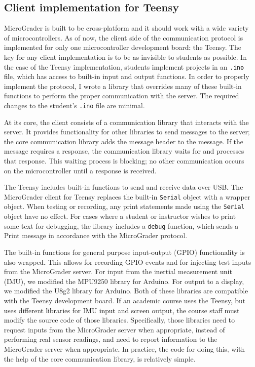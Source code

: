 \documentclass[12pt]{article}
\begin{document}
\begin{appendices}
\section{Client implementation for Teensy}
\label{sec:teensy}
MicroGrader is built to be cross-platform and it should work with a wide variety of microcontrollers.  As of now, the client side of the communication protocol is implemented for only one microcontroller development board: the Teensy.  The key for any client implementation is to be as invisible to students as possible.  In the case of the Teensy implementation, students implement projects in an \texttt{.ino} file, which has access to built-in input and output functions.  In order to properly implement the protocol, I wrote a library that overrides many of these built-in functions to perform the proper communication with the server.  The required changes to the student's \texttt{.ino} file are minimal.

At its core, the client consists of a communication library that interacts with the server.  It provides functionality for other libraries to send messages to the server; the core communication library adds the message header to the message.  If the message requires a response, the communication library waits for and processes that response.  This waiting process is blocking; no other communication occurs on the microcontroller until a response is received.

The Teensy includes built-in functions to send and receive data over USB.  The MicroGrader client for Teensy replaces the built-in \texttt{Serial} object with a wrapper object.  When testing or recording, any print statements made using the \texttt{Serial} object have no effect.  For cases where a student or instructor wishes to print some text for debugging, the library includes a \texttt{debug} function, which sends a Print message in accordance with the MicroGrader protocol.  

The built-in functions for general purpose input-output (GPIO) functionality is also wrapped.  This allows for recording GPIO events and for injecting test inputs from the MicroGrader server.  For input from the inertial measurement unit (IMU), we modified the MPU9250 \cite{MPU9250} library for Arduino.  For output to a display, we modified the U8g2 \cite{u8g2} library for Arduino.  Both of these libraries are compatible with the Teensy development board.  If an academic course uses the Teensy, but uses different libraries for IMU input and screen output, the course staff must modify the source code of those libraries.  Specifically, those libraries need to request inputs from the MicroGrader server when appropriate, instead of performing real sensor readings, and need to report information to the MicroGrader server when appropriate.  In practice, the code for doing this, with the help of the core communication library, is relatively simple.


\end{appendices}
\end{document}
